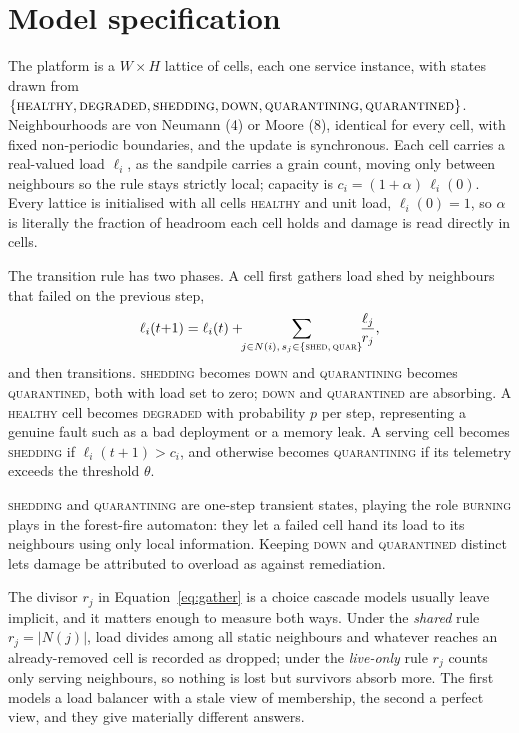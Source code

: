 \documentclass[11pt,a4paper]{article}
\begin{document}
\section{Model specification}

The platform is a $W \times H$ lattice of cells, each one service instance, with
states drawn from $\{\textsc{healthy}, \textsc{degraded}, \textsc{shedding},
\textsc{down}, \textsc{quarantining}, \textsc{quarantined}\}$. Neighbourhoods
are von Neumann (4) or Moore (8), identical for every cell, with fixed
non-periodic boundaries, and the update is synchronous. Each cell carries a
real-valued load $\ell_i$, as the sandpile carries a grain count, moving only
between neighbours so the rule stays strictly local; capacity is
$c_i = (1+\alpha)\,\ell_i(0)$. Every lattice is initialised with all cells
\textsc{healthy} and unit load, $\ell_i(0) = 1$, so $\alpha$ is literally the
fraction of headroom each cell holds and damage is read directly in cells.

The transition rule has two phases. A cell first gathers load shed by neighbours
that failed on the previous step,
\begin{equation}
\ell_i(t{+}1) = \ell_i(t) + \!\!\sum_{j \in N(i),\, s_j \in \{\textsc{shed},\,\textsc{quar}\}}\!\! \frac{\ell_j}{r_j},
\label{eq:gather}
\end{equation}
and then transitions. \textsc{shedding} becomes \textsc{down} and
\textsc{quarantining} becomes \textsc{quarantined}, both with load set to zero;
\textsc{down} and \textsc{quarantined} are absorbing. A \textsc{healthy} cell
becomes \textsc{degraded} with probability $p$ per step, representing a genuine
fault such as a bad deployment or a memory leak. A serving cell becomes
\textsc{shedding} if $\ell_i(t{+}1) > c_i$, and otherwise becomes
\textsc{quarantining} if its telemetry exceeds the threshold $\theta$.

\textsc{shedding} and \textsc{quarantining} are one-step transient states,
playing the role \textsc{burning} plays in the forest-fire automaton: they let a
failed cell hand its load to its neighbours using only local information.
Keeping \textsc{down} and \textsc{quarantined} distinct lets damage be
attributed to overload as against remediation.

The divisor $r_j$ in Equation~\ref{eq:gather} is a choice cascade models usually
leave implicit, and it matters enough to measure both ways. Under the
\emph{shared} rule $r_j = |N(j)|$, load divides among all static neighbours and
whatever reaches an already-removed cell is recorded as dropped; under the
\emph{live-only} rule $r_j$ counts only serving neighbours, so nothing is lost
but survivors absorb more. The first models a load balancer with a stale view of
membership, the second a perfect view, and they give materially different
answers.
\end{document}
